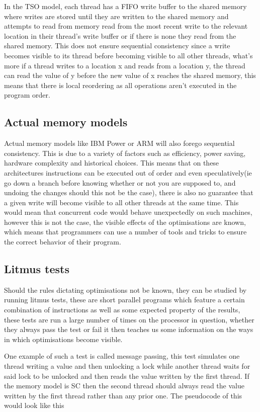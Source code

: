 \documentclass[a4,12pt]{article}
\begin{document}
In the TSO model, each thread has a FIFO write buffer to the shared memory where writes are stored until they are written to the shared memory and attempts to read from memory read from the most recent write to the relevant location in their thread's write buffer or if there is none they read from the shared memory. This does not ensure sequential consistency since a write becomes visible to its thread before becoming visible to all other threads, what's more if a thread writes to a location x and reads from a location y, the thread can read the value of y before the new value of x reaches the shared memory, this means that there is local reordering as all operations aren't executed in the program order.

\subsection{Actual memory models}

Actual memory models like IBM Power or ARM will also forego sequential consistency. This is due to a variety of factors such as efficiency, power saving, hardware complexity and historical choices. This means that on these architectures instructions can be executed out of order and even speculatively(ie go down a branch before knowing whether or not you are supposed to, and undoing the changes should this not be the case), there is also no guarantee that a given write will become visible to all other threads at the same time. This would mean that concurrent code would behave unexpectedly on such machines, however this is not the case, the visible effects of the optimisations are known, which means that programmers can use a number of tools and tricks to ensure the correct behavior of their program.

\subsection{Litmus tests}

Should the rules dictating optimisations not be known, they can be studied by running litmus tests, these are short parallel programs which feature a certain combination of instructions as well as some expected property of the results, these tests are run a large number of times on the processor in question, whether they always pass the test or fail it then teaches us some information on the ways in which optimisations become visible.

One example of such a test is called message passing, this test simulates one thread writing a value and then unlocking a lock while another thread waits for said lock to be unlocked and then reads the value written by the first thread. If the memory model is SC then the second thread should always read the value written by the first thread rather than any prior one. The pseudocode of this would look like this
\end{document}
